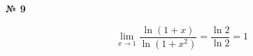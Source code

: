 \documentclass{article}
\begin{document}
\textbf{№ 9}

$$ \lim\limits_{x\to 1} \frac{\ln{(1+x)}}{\ln{(1+x^2)}}
= \frac{\ln{2}}{\ln{2}} 
= 1 $$
\end{document}
